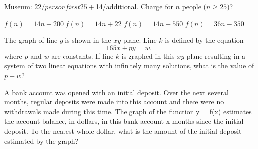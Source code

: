 \documentclass[12pt]{exam}
\begin{document}
\begin{questions}
\question Museum: $22/person first 25 + $14/additional. Charge for $n$ people ($n \geq 25$)?
\begin{choices}
\choice $f(n) = 14n + 200$
\choice $f(n) = 14n + 22$
\choice $f(n) = 14n + 550$
\choice $f(n) = 36n - 350$
\end{choices}

\question The graph of line $g$ is shown in the $xy$-plane. Line $k$ is defined by the equation
\[
165x + py = w,
\]
where $p$ and $w$ are constants. If line $k$ is graphed in this $xy$-plane resulting in a system of two linear equations with infinitely many solutions, what is the value of $p + w$?

\begin{center}
\end{center}

\question A bank account was opened with an initial deposit. Over the next several months, regular deposits were made into this account and there were no withdrawals made during this time. The graph of the function y = f(x) estimates the account balance, in dollars, in this bank account x months since the initial deposit. To the nearest whole dollar, what is the amount of the initial deposit estimated by the graph?
\begin{center}
\end{center}
\end{questions}
\end{document}
